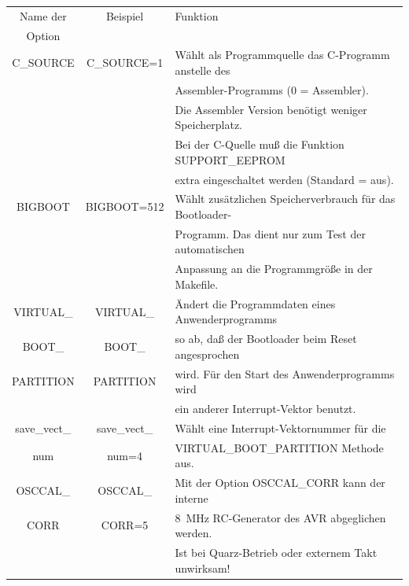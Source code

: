 \begin{table}[H]
  \begin{center}
    \begin{tabular}{| c | c | l |}
    \hline
   Name der        & Beispiel       & Funktion                                            \\
    Option         &                &                                                     \\
    \hline
    \hline
 C\_SOURCE         & C\_SOURCE=1    & Wählt als Programmquelle das C-Programm anstelle des  \\
                   &                & Assembler-Programms (0 = Assembler).\\
                   &                & Die Assembler Version benötigt weniger Speicherplatz. \\
                   &                & Bei der C-Quelle muß die Funktion SUPPORT\_EEPROM  \\
                   &                & extra eingeschaltet werden (Standard = aus). \\
    \hline
 BIGBOOT           & BIGBOOT=512    & Wählt zusätzlichen Speicherverbrauch für das Bootloader- \\
                   &                & Programm. Das dient nur zum Test der automatischen \\
                   &                & Anpassung an die Programmgröße in der Makefile. \\
    \hline
VIRTUAL\_          & VIRTUAL\_       &  Ändert die Programmdaten eines Anwenderprogramms \\
 BOOT\_            & BOOT\_          & so ab, daß der Bootloader beim Reset angesprochen \\
 PARTITION         & PARTITION       & wird. Für den Start des Anwenderprogramms wird \\
		   &                 & ein anderer Interrupt-Vektor benutzt.          \\
    \hline
 save\_vect\_      & save\_vect\_    & Wählt eine Interrupt-Vektornummer für die  \\
      num          &    num=4        & VIRTUAL\_BOOT\_PARTITION Methode aus.        \\
    \hline
 OSCCAL\_          & OSCCAL\_       & Mit der Option OSCCAL\_CORR kann der interne \\
 CORR              & CORR=5         & 8~MHz RC-Generator des AVR abgeglichen werden. \\
                   &                & Ist bei Quarz-Betrieb oder externem Takt unwirksam! \\

\end{tabular}
\end{center}
\end{table}
